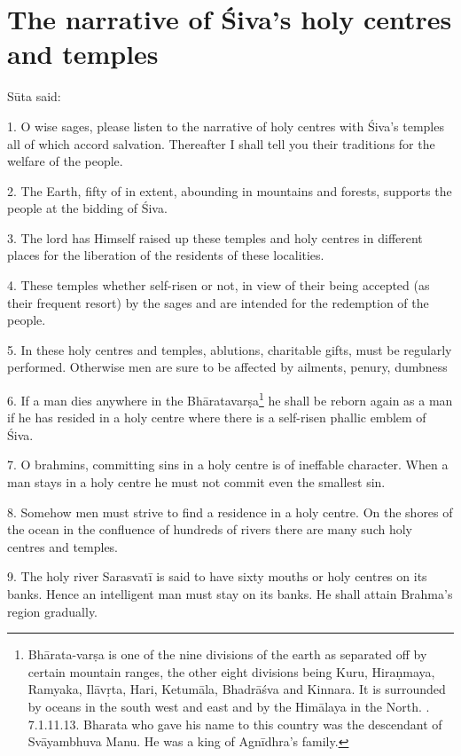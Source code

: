 \chapter{The narrative of Śiva’s holy centres and temples}

Sūta said:

1. O wise sages, please listen to the narrative of holy centres with Śiva’s
temples all of which accord salvation. Thereafter I shall tell you their
traditions for the welfare of the people.

2. The Earth, fifty  of  in extent, abounding in
mountains and forests, supports the people at the bidding of Śiva.

3. The lord has Himself raised up these temples and holy centres in different
places for the liberation of the residents of these localities.

4. These temples whether self-risen or not, in view of their being accepted (as
their frequent resort) by the sages and  are intended for
the redemption of the people.

5. In these holy centres and temples, ablutions, charitable gifts, 
\etc must be regularly performed. Otherwise men are sure to be affected by
ailments, penury, dumbness \etc

6. If a man dies anywhere in the Bhāratavarṣa\footnote{Bhārata-varṣa is one of
the nine divisions of the earth as separated off by certain mountain ranges,
the other eight divisions being Kuru, Hiraṇmaya, Ramyaka, Ilāvṛta, Hari,
Ketumāla, Bhadrāśva and Kinnara. It is surrounded by oceans in the south west
and east and by the Himālaya in the North. . 7.1.11.13. Bharata who gave his
name to this country was the descendant of Svāyambhuva Manu. He was a king of
Agnīdhra’s family.} he shall be reborn again as a man if he has resided in
a holy centre where there is a self-risen phallic emblem of Śiva.

7. O brahmins, committing sins in a holy centre is of ineffable character. When
a man stays in a holy centre he must not commit even the smallest sin.

8. Somehow men must strive to find a residence in a holy centre. On the shores
of the ocean in the confluence of hundreds of rivers there are many such holy
centres and temples.

9. The holy river Sarasvatī is said to have sixty mouths or holy centres on its
banks. Hence an intelligent man must stay on its banks. He shall attain Brahma’s
region gradually.

